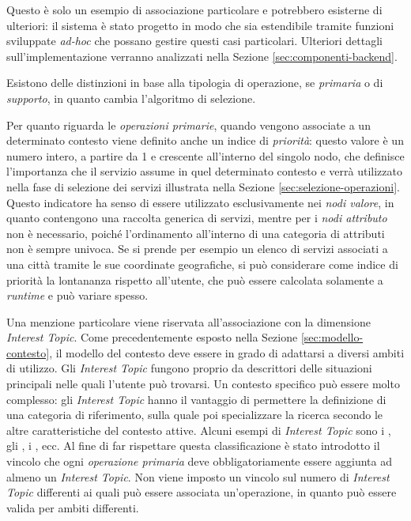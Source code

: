 Questo è solo un esempio di associazione particolare e potrebbero esisterne di ulteriori: il sistema è stato progetto in modo che sia estendibile tramite funzioni sviluppate \emph{ad-hoc} che possano gestire questi casi particolari. Ulteriori dettagli sull'implementazione verranno analizzati nella Sezione \ref{sec:componenti-backend}.

Esistono delle distinzioni in base alla tipologia di operazione, se \emph{primaria} o di \emph{supporto}, in quanto cambia l'algoritmo di selezione.

Per quanto riguarda le \emph{operazioni primarie}, quando vengono associate a un determinato contesto viene definito anche un indice di \emph{priorità}: questo valore è un numero intero, a partire da 1 e crescente all'interno del singolo nodo, che definisce l'importanza che il servizio assume in quel determinato contesto e verrà utilizzato nella fase di selezione dei servizi illustrata nella Sezione \ref{sec:selezione-operazioni}. Questo indicatore ha senso di essere utilizzato esclusivamente nei \emph{nodi valore}, in quanto contengono una raccolta generica di servizi, mentre per i \emph{nodi attributo} non è necessario, poiché l'ordinamento all'interno di una categoria di attributi non è sempre univoca. Se si prende per esempio un elenco di servizi associati a una città tramite le sue coordinate geografiche, si può considerare come indice di priorità la lontananza rispetto all'utente, che può essere calcolata solamente a \emph{runtime} e può variare spesso.

Una menzione particolare viene riservata all'associazione con la dimensione \emph{Interest Topic}. Come precedentemente esposto nella Sezione \ref{sec:modello-contesto}, il modello del contesto deve essere in grado di adattarsi a diversi ambiti di utilizzo. Gli \emph{Interest Topic} fungono proprio da descrittori delle situazioni principali nelle quali l'utente può trovarsi. Un contesto specifico può essere molto complesso: gli \emph{Interest Topic} hanno il vantaggio di permettere la definizione di una categoria di riferimento, sulla quale poi specializzare la ricerca secondo le altre caratteristiche del contesto attive. Alcuni esempi di \emph{Interest Topic} sono i , gli , i , ecc.
Al fine di far rispettare questa classificazione è stato introdotto il vincolo che ogni \emph{operazione primaria} deve obbligatoriamente essere aggiunta ad almeno un \emph{Interest Topic}. Non viene imposto un vincolo sul numero di \emph{Interest Topic} differenti ai quali può essere associata un'operazione, in quanto può essere valida per ambiti differenti.

